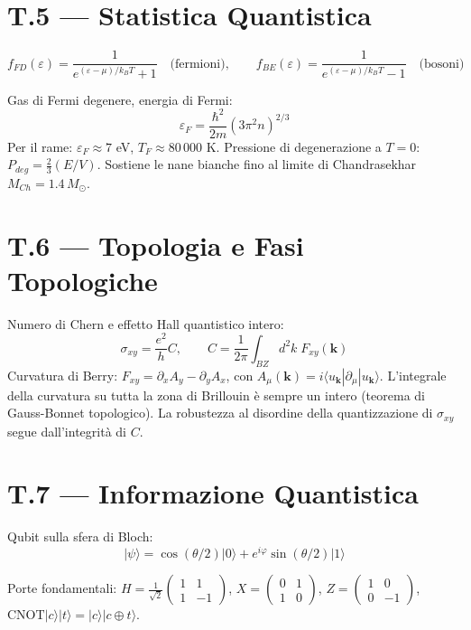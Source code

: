 \documentclass[12pt,a4paper,openany]{book}
\begin{document}
\chapter*{T.5 — Statistica Quantistica}

\[
f_{FD}(\varepsilon) = \frac{1}{e^{(\varepsilon-\mu)/k_BT}+1}\quad\text{(fermioni)},\qquad f_{BE}(\varepsilon) = \frac{1}{e^{(\varepsilon-\mu)/k_BT}-1}\quad\text{(bosoni)}
\]

Gas di Fermi degenere, energia di Fermi:
\[
\varepsilon_F = \frac{\hbar^2}{2m}(3\pi^2 n)^{2/3}
\]
Per il rame: $\varepsilon_F \approx 7$ eV, $T_F \approx 80\,000$ K. Pressione di degenerazione a $T=0$: $P_{deg} = \frac{2}{3}(E/V)$. Sostiene le nane bianche fino al limite di Chandrasekhar $M_{Ch} = 1.4\,M_\odot$.

\chapter*{T.6 — Topologia e Fasi Topologiche}

Numero di Chern e effetto Hall quantistico intero:
\[
\sigma_{xy} = \frac{e^2}{h}C,\qquad C = \frac{1}{2\pi}\int_{BZ}d^2k\;F_{xy}(\mathbf{k})
\]
Curvatura di Berry: $F_{xy} = \partial_x A_y - \partial_y A_x$, con $A_\mu(\mathbf{k}) = i\langle u_\mathbf{k}|\partial_\mu|u_\mathbf{k}\rangle$. L'integrale della curvatura su tutta la zona di Brillouin è sempre un intero (teorema di Gauss-Bonnet topologico). La robustezza al disordine della quantizzazione di $\sigma_{xy}$ segue dall'integrità di $C$.

\chapter*{T.7 — Informazione Quantistica}

Qubit sulla sfera di Bloch:
\[
|\psi\rangle = \cos(\theta/2)|0\rangle + e^{i\varphi}\sin(\theta/2)|1\rangle
\]

Porte fondamentali: $H = \tfrac{1}{\sqrt{2}}\begin{pmatrix}1&1\\1&-1\end{pmatrix}$, $X = \begin{pmatrix}0&1\\1&0\end{pmatrix}$, $Z = \begin{pmatrix}1&0\\0&-1\end{pmatrix}$, $\mathrm{CNOT}|c\rangle|t\rangle = |c\rangle|c\oplus t\rangle$.
\end{document}
